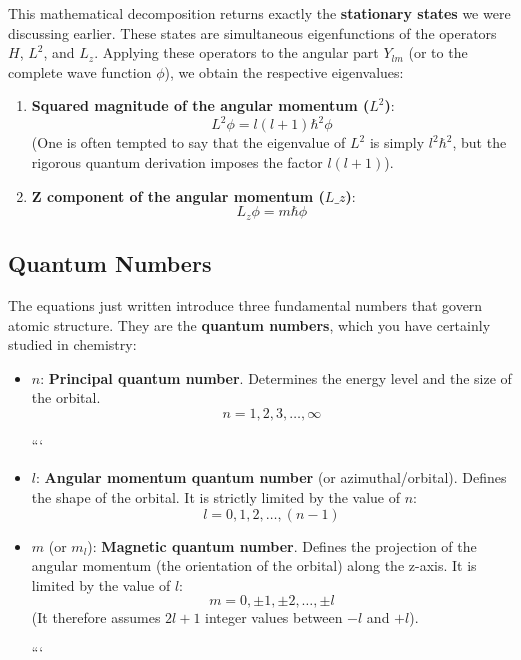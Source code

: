 This mathematical decomposition returns exactly the \textbf{stationary states} we were discussing earlier. These states are simultaneous eigenfunctions of the operators $H$, $L^2$, and $L_z$.
Applying these operators to the angular part $Y_{lm}$ (or to the complete wave function $\phi$), we obtain the respective eigenvalues:

\begin{enumerate}
\item \textbf{Squared magnitude of the angular momentum ($L^2$)}:
\begin{equation}
L^2 \phi = l(l+1)\hbar^2 \phi
\end{equation}
(One is often tempted to say that the eigenvalue of $L^2$ is simply $l^2 \hbar^2$, but the rigorous quantum derivation imposes the factor $l(l+1)$).


\item \textbf{Z component of the angular momentum ($L\_z$)}:
\begin{equation}
L_z \phi = m \hbar \phi
\end{equation}


\end{enumerate}

\subsection{Quantum Numbers}

The equations just written introduce three fundamental numbers that govern atomic structure. They are the \textbf{quantum numbers}, which you have certainly studied in chemistry:

\begin{itemize}
\item $n$: \textbf{Principal quantum number}. Determines the energy level and the size of the orbital.
\begin{equation}
n = 1, 2, 3, \ldots, \infty
\end{equation}


```

\item $l$: \textbf{Angular momentum quantum number} (or azimuthal/orbital). Defines the shape of the orbital. It is strictly limited by the value of $n$:
\begin{equation}
l = 0, 1, 2, \ldots, (n-1)
\end{equation}

\item $m$ (or $m_l$): \textbf{Magnetic quantum number}. Defines the projection of the angular momentum (the orientation of the orbital) along the z-axis. It is limited by the value of $l$:
\begin{equation}
m = 0, \pm 1, \pm 2, \ldots, \pm l
\end{equation}
(It therefore assumes $2l+1$ integer values between $-l$ and $+l$).

```

\end{itemize}

